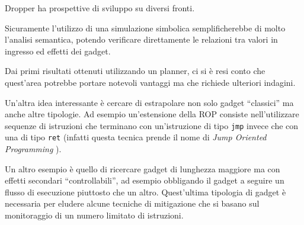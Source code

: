 Dropper ha prospettive di sviluppo su diversi fronti. 

Sicuramente l'utilizzo di una simulazione simbolica semplificherebbe
di molto l'analisi semantica, potendo verificare direttamente le
relazioni tra valori in ingresso ed effetti dei gadget. 

Dai primi risultati ottenuti utilizzando un planner,  ci si è resi
conto che quest'area potrebbe portare notevoli vantaggi ma che
richiede ulteriori indagini.

Un'altra idea interessante è cercare di estrapolare non solo gadget
``classici'' ma anche altre tipologie. Ad esempio un'estensione della
ROP consiste nell'utilizzare sequenze di istruzioni che terminano con
un'istruzione di tipo \lstinline{jmp} invece che con una di tipo
\lstinline{ret} (infatti questa tecnica prende il nome di \emph{Jump
  Oriented Programming} \cite{Checkoway-10}).

Un altro esempio è quello di ricercare gadget di lunghezza maggiore ma
con effetti secondari ``controllabili'', ad esempio obbligando il
gadget a seguire un flusso di esecuzione piuttosto che
un altro. Quest'ultima tipologia di gadget è necessaria per eludere
alcune tecniche di mitigazione che si basano sul monitoraggio di un
numero limitato di istruzioni.

